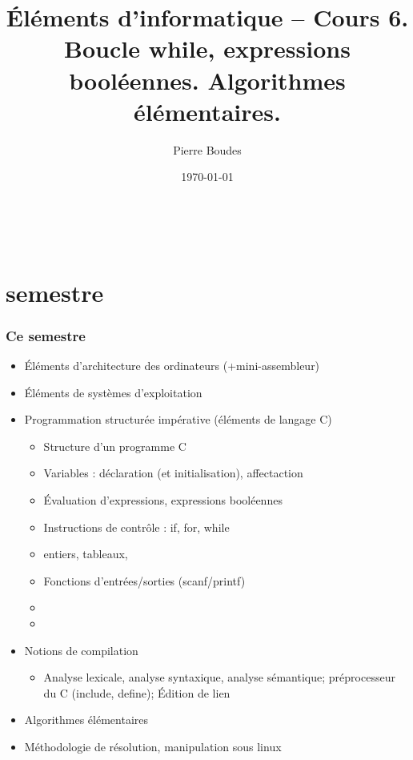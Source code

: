 \documentclass[xcolor=pdftex,svgnames,table]{beamer}
\title{Éléments d'informatique -- Cours 6. Boucle while,
expressions booléennes. Algorithmes élémentaires.}
\author{Pierre Boudes}
\date{\today}
\begin{document}
\begin{frame}
	\titlepage
	\vfill
	\begin{center}
		\\[2.5ex]
		{\tiny\CcNote{\CcLongnameByNcSa}}
		\vspace*{-2.5ex}
	\end{center}
\end{frame}

\section[Plan]{}
\frame[label=plan]{\tableofcontents}

\section[Plan du cours]{semestre}
\begin{frame}
  \frametitle{Ce semestre\nowrite}

  \begin{itemize}
  \item \color{DarkGreen}  Éléments d'architecture des ordinateurs (+mini-assembleur)
  \item Éléments de systèmes d'exploitation
\item Programmation structurée impérative (éléments de langage C)
\begin{itemize}
  \item  \color{DarkGreen} Structure d'un programme C
  \item Variables : déclaration (et initialisation), affectaction
  \item Évaluation d'expressions, \alert{expressions booléennes}
  \item Instructions de contrôle : if, for, \alert{while}
  \item {} entiers,   tableaux, 
  \item Fonctions d'entrées/sorties (scanf/printf)
\item {}
  \item {}
\end{itemize}
\item Notions de compilation
  \begin{itemize}
  \item  \color{DarkGreen} Analyse lexicale, analyse syntaxique, analyse sémantique;
  préprocesseur du C (include, define);
  Édition de lien
  \end{itemize}
\item \alert{Algorithmes élémentaires}
\item Méthodologie de résolution, manipulation sous linux
\end{itemize}
 \end{frame}
\end{document}
